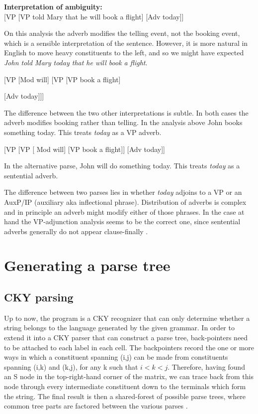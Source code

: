 \documentclass{article}
\begin{document}
\textbf{Interpretation of ambiguity:}\\
{[}VP {[}VP told Mary that he will book a flight{]} {[}Adv today{]}{]}

On this analysis the adverb modifies the telling event, not the booking event, which is	a sensible interpretation of the sentence. However, it is more natural in English to move heavy constituents to the left, and so we might have expected \emph{John told Mary today that he will book a flight}.

{[}VP {[}Mod will{]} {[}VP {[}VP book a flight{]} {[Adv today{]}{]}{]}

The difference between the two other interpretations is subtle. In both cases the adverb modifies booking rather than telling. In the analysis above John books something today. This treats \emph{today} as a VP adverb.

{[}VP {[}VP {[} Mod will{]} {[}VP book a flight{]}{]} {[}Adv today{]}{]}

In the alternative parse, John will do something today. This treats \emph{today} as a sentential adverb.

The difference between two parses lies in whether \emph{today} adjoins to a VP or an AuxP/IP (auxiliary aka inflectional phrase). Distribution of adverbs is complex and in principle an adverb might modify either of those phrases. In the case at hand the VP-adjunction analysis seems to be the correct one, since sentential adverbs generally do not appear clause-finally \cite{potsdam1998adverbs}. 




\section{Generating a parse tree}

\subsection{CKY parsing}

Up to now, the program is a CKY recognizer that can only determine whether a string belongs to the language generated by the given grammar. In order to extend it into a CKY parser that can construct a parse tree, back-pointers need to be attached to each label in each cell. The backpointers record the one or more ways in which a constituent spanning (i,j) can be made from constituents spanning (i,k) and (k,j), for any k such that $i < k < j$.  Therefore, having found an S node in the top-right-hand corner of the matrix, we can trace back from this node through every intermediate constituent down to the terminals which form the string. The final result is then a shared-forest of possible parse trees, where common tree parts are factored between the various parses \cite{lang1994recognition}.

}
\end{document}
